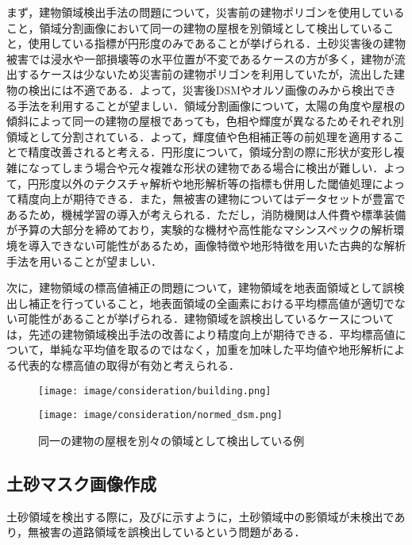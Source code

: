       まず，建物領域検出手法の問題について，災害前の建物ポリゴンを使用していること，領域分割画像において同一の建物の屋根を別領域として検出していること，使用している指標が円形度のみであることが挙げられる．土砂災害後の建物被害では浸水や一部損壊等の水平位置が不変であるケースの方が多く，建物が流出するケースは少ないため災害前の建物ポリゴンを利用していたが，流出した建物の検出には不適である．よって，災害後DSMやオルソ画像のみから検出できる手法を利用することが望ましい．領域分割画像について，太陽の角度や屋根の傾斜によって同一の建物の屋根であっても，色相や輝度が異なるためそれぞれ別領域として分割されている．よって，輝度値や色相補正等の前処理を適用することで精度改善されると考える．円形度について，領域分割の際に形状が変形し複雑になってしまう場合や元々複雑な形状の建物である場合に検出が難しい．よって，円形度以外のテクスチャ解析や地形解析等の指標も併用した閾値処理によって精度向上が期待できる．また，無被害の建物についてはデータセットが豊富であるため，機械学習の導入が考えられる．ただし，消防機関は人件費や標準装備が予算の大部分を締めており，実験的な機材や高性能なマシンスペックの解析環境を導入できない可能性があるため，画像特徴や地形特徴を用いた古典的な解析手法を用いることが望ましい\cite{消防白書}．

      次に，建物領域の標高値補正の問題について，建物領域を地表面領域として誤検出し補正を行っていること，地表面領域の全画素における平均標高値が適切でない可能性があることが挙げられる．建物領域を誤検出しているケースについては，先述の建物領域検出手法の改善により精度向上が期待できる．平均標高値について，単純な平均値を取るのではなく，加重を加味した平均値や地形解析による代表的な標高値の取得が有効と考えられる．

      \begin{figure}[tbp]
        \begin{minipage}[c]{0.5\hsize}
          \centering
          \texttt{[image: image/consideration/building.png]}
        \end{minipage}
        \begin{minipage}[c]{0.5\hsize}
          \centering
          \texttt{[image: image/consideration/normed\_dsm.png]}
        \end{minipage}
        \caption{同一の建物の屋根を別々の領域として検出している例}
        \label{建物領域低精度例}
      \end{figure}      


    \subsection*{土砂マスク画像作成}
      土砂領域を検出する際に，及びに示すように，土砂領域中の影領域が未検出であり，無被害の道路領域を誤検出しているという問題がある．

